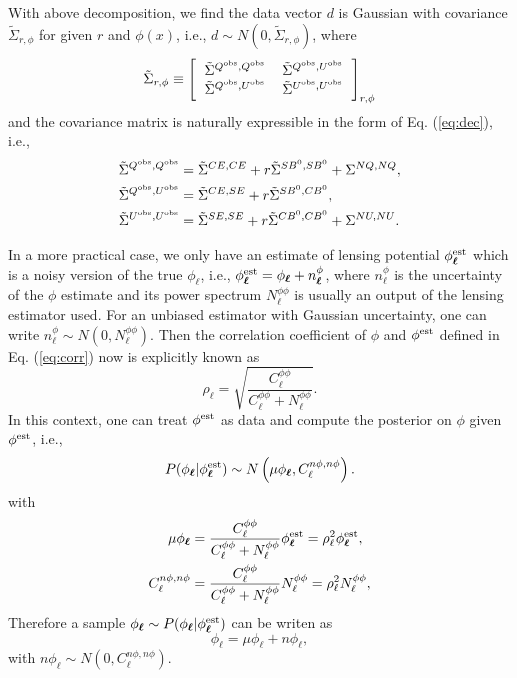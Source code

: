 \documentclass[aps, prd, reprint, nofootinbib, groupedaddress, showpacs]{revtex4-1}
\def\be{\begin{equation}}
\def\ee{\end{equation}}
\newcommand*\Bell{\ensuremath{\boldsymbol\ell}}
\begin{document}
With above decomposition, we find the data vector $d$ is Gaussian with covariance $\tilde\Sigma_{r, \phi}$
for given $r$ and $\phi(x)$, i.e., $d \sim  N(0, \tilde\Sigma_{r, \phi})$, where
\be
\tilde\Sigma_{r, \phi} \equiv
\left[
\begin{tabular}{cc}
  $\tilde \Sigma^{Q^{\rm obs},Q^{\rm obs}}$ & $\tilde\Sigma^{Q^{\rm obs},U^{\rm obs}}$  \\
  $\tilde \Sigma^{Q^{\rm obs},U^{\rm obs}}$ & $\tilde\Sigma^{U^{\rm obs},U^{\rm obs}}$
  \end{tabular}
\right]_{r,\phi}
\ee
and the covariance matrix is naturally expressible in the form of Eq. (\ref{eq:dec}), i.e.,
\be
\label{eq:elements}
\begin{aligned}
    \tilde \Sigma^{Q^{\rm obs},Q^{\rm obs}} &= \tilde\Sigma^{CE,CE} + r \tilde\Sigma^{SB^0, SB^0} + \Sigma^{NQ,NQ},\\
    \tilde \Sigma^{Q^{\rm obs},U^{\rm obs}} &= \tilde\Sigma^{CE,SE} + r \tilde\Sigma^{SB^0, CB^0} ,\\
    \tilde \Sigma^{U^{\rm obs},U^{\rm obs}} &= \tilde\Sigma^{SE,SE} + r \tilde\Sigma^{CB^0, CB^0} + \Sigma^{NU,NU}.
\end{aligned}
\ee

In a more practical case, we only have an estimate of lensing potential $\phi_{\Bell}^{\rm est}$
which is a noisy version of the true $\phi_{\Bell}$,
i.e., $\phi_{\Bell}^{\rm est} = \phi_{\Bell} + n^\phi_{\Bell}$,
where $n^\phi_{\Bell}$ is the uncertainty of the $\phi$ estimate
and its power spectrum $N_\ell^{\phi\phi}$ is usually an output of the lensing estimator used.
For an unbiased estimator with Gaussian uncertainty, one can write $n^\phi_{\Bell}\sim N(0, N_\ell^{\phi\phi})$.
Then the correlation coefficient of $\phi$ and $\phi^{\rm est}$ defined in Eq. (\ref{eq:corr}) now
is explicitly known as
\be
\rho_\ell =  \sqrt{\frac{C_\ell^{\phi\phi}}{C_\ell^{\phi\phi} + N_\ell^{\phi\phi}}}.
\ee
In this context, one can treat $\phi^{\rm est}$ as data and compute the
posterior on $\phi$ given $\phi^{\rm est}$, i.e.,
\be
P(\phi_{\Bell} | \phi^{\rm est}_{\Bell})
\sim N\left(\mu\phi_{\Bell},
C_{\ell}^{n\phi,n\phi}\right).
\ee
with
\be
\label{eq:wf}
\begin{aligned}
\mu \phi_{\Bell} &= \frac{C_\ell^{\phi\phi}}{C_\ell^{\phi\phi} + N_\ell^{\phi\phi}} \phi_{\Bell}^{\rm est}
=\rho_\ell^2 \phi_{\Bell}^{\rm est}, \\
C_{\ell}^{n\phi,n\phi}& = \frac{C_\ell^{\phi\phi}}{C_\ell^{\phi\phi} + N_\ell^{\phi\phi}}N_\ell^{\phi\phi}
=\rho_\ell^2  N_\ell^{\phi\phi},
\end{aligned}
\ee
Therefore a sample $\phi_{\Bell}  \sim P(\phi_{\Bell} | \phi^{\rm est}_{\Bell})$ can be writen as
\be
\phi_{\Bell} = \mu\phi_{\Bell} + n\phi_{\Bell},
\ee
with $n\phi_{\Bell}\sim N(0, C_\ell^{n\phi,n\phi})$.
\end{document}
